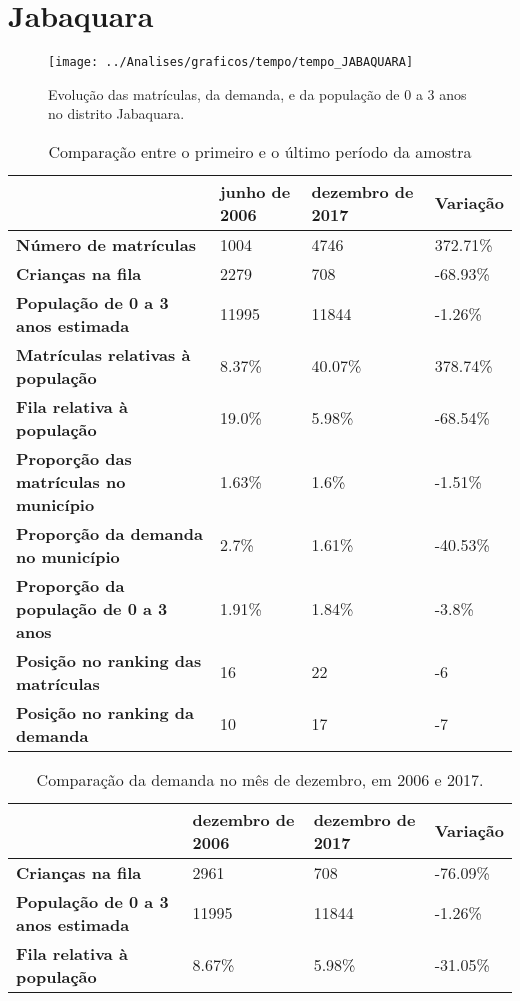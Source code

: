 \section{Jabaquara}
\begin{figure}[H]
\centering
\texttt{[image: ../Analises/graficos/tempo/tempo\_JABAQUARA]}
\caption{Evolução das matrículas, da demanda, e da população de 0 a 3 anos no distrito Jabaquara.}
\end{figure}
\begin{table}[H]
\begin{tabular}{|l|l|l|l|}
\hline
\textbf{}                                      & \textbf{junho de 2006}       & \textbf{dezembro de 2017}    & \textbf{Variação} \\ \hline
\textbf{Número de matrículas}                  & 1004 & 4746 & 372.71\% \\ \hline
\textbf{Crianças na fila}                      & 2279 & 708 & -68.93\% \\ \hline
\textbf{População de 0 a 3 anos estimada}      & 11995 & 11844 & -1.26\% \\ \hline
\textbf{Matrículas relativas à população}      & 8.37\% & 40.07\% & 378.74\% \\ \hline
\textbf{Fila relativa à população}             & 19.0\% & 5.98\% & -68.54\% \\ \hline
\textbf{Proporção das matrículas no município} & 1.63\% & 1.6\% & -1.51\% \\ \hline
\textbf{Proporção da demanda no município}     & 2.7\% & 1.61\% & -40.53\% \\ \hline
\textbf{Proporção da população de 0 a 3 anos}  & 1.91\% & 1.84\% & -3.8\% \\ \hline
\textbf{Posição no ranking das matrículas}     & 16 & 22 & -6 \\ \hline
\textbf{Posição no ranking da demanda}         & 10 & 17 & -7 \\ \hline
\end{tabular}
\caption{Comparação entre o primeiro e o último período da amostra}
\end{table}
\begin{table}[H]
\begin{tabular}{|l|l|l|l|}
\hline
\textbf{}                                 & \textbf{dezembro de 2006} & \textbf{dezembro de 2017} & \textbf{Variação} \\ \hline
\textbf{Crianças na fila}                      & 2961 & 708 & -76.09\% \\ \hline
\textbf{População de 0 a 3 anos estimada}      & 11995 & 11844 & -1.26\% \\ \hline
\textbf{Fila relativa à população}             & 8.67\% & 5.98\% & -31.05\% \\ \hline
\end{tabular}
\caption{Comparação da demanda no mês de dezembro, em 2006 e 2017.}
\end{table}

